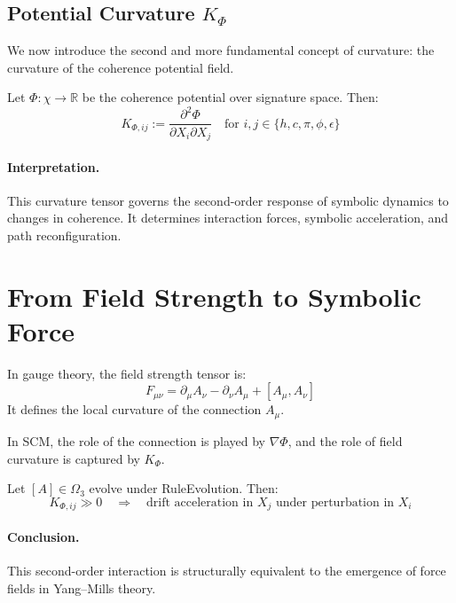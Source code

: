 \subsection{Potential Curvature \( K_\Phi \)}

We now introduce the second and more fundamental concept of curvature: the curvature of the coherence potential field.

\begin{definition}
Let \( \Phi: \chi \to \mathbb{R} \) be the coherence potential over signature space. Then:
\[
K_{\Phi, ij} := \frac{\partial^2 \Phi}{\partial X_i \partial X_j}
\quad \text{for } i, j \in \{ h, c, \pi, \phi, \epsilon \}
\]
\end{definition}

\paragraph{Interpretation.}
This curvature tensor governs the second-order response of symbolic dynamics to changes in coherence. It determines interaction forces, symbolic acceleration, and path reconfiguration.

\section{From Field Strength to Symbolic Force}

\begin{definition}
In gauge theory, the field strength tensor is:
\[
F_{\mu\nu} = \partial_\mu A_\nu - \partial_\nu A_\mu + [A_\mu, A_\nu]
\]
It defines the local curvature of the connection \( A_\mu \).
\end{definition}

In SCM, the role of the connection is played by \( \nabla \Phi \), and the role of field curvature is captured by \( K_\Phi \).

\begin{proposition}
Let \( [A] \in \Omega_3 \) evolve under RuleEvolution. Then:
\[
K_{\Phi, ij} \gg 0 \quad \Rightarrow \quad \text{drift acceleration in } X_j \text{ under perturbation in } X_i
\]
\end{proposition}

\paragraph{Conclusion.}
This second-order interaction is structurally equivalent to the emergence of force fields in Yang--Mills theory.

